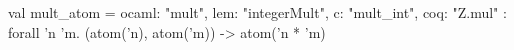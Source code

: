 val mult_atom = {ocaml: "mult", lem: "integerMult", c: "mult_int", coq: "Z.mul"} : forall 'n 'm.
  (atom('n), atom('m)) -> atom('n * 'm)
